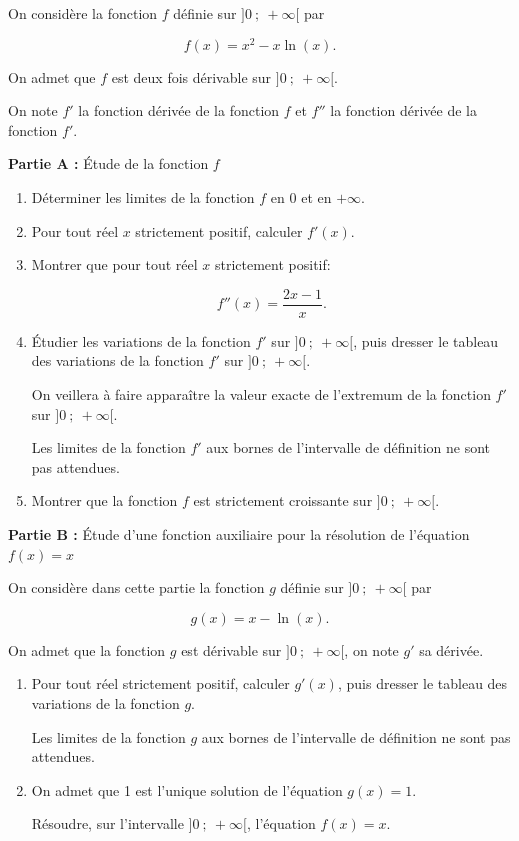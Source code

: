 \medskip

On considère la fonction $f$ définie sur $]0 ~;~+ \infty[$ par 

\[f(x) = x^2 - x \ln (x).\]

On admet que $f$ est deux fois dérivable sur $]0 ~;~+ \infty[$.

On note $f'$ la fonction dérivée de la fonction $f$ et $f''$ la fonction dérivée de la fonction $f'$.

\medskip

\textbf{Partie A :} Étude de la fonction $f$

\medskip

\begin{enumerate}
\item Déterminer les limites de la fonction $f$ en $0$ et en $+\infty$.
\item Pour tout réel $x$ strictement positif, calculer $f'(x)$.
\item Montrer que pour tout réel $x$ strictement positif:

\[f''(x) = \dfrac{2x - 1}{x}.\]

\item Étudier les variations de la fonction $f'$ sur $]0 ~;~+ \infty[$, puis dresser le tableau des variations de la fonction $f'$ sur $]0 ~;~+ \infty[$.

On veillera à faire apparaître la valeur exacte de l'extremum de la fonction $f'$ sur $]0 ~;~+ \infty[$.

Les limites de la fonction $f'$ aux bornes de l'intervalle de définition ne sont pas attendues.
\item Montrer que la fonction $f$ est strictement croissante sur $]0 ~;~+ \infty[$.
\end{enumerate}

\medskip

\textbf{Partie B :} Étude d'une fonction auxiliaire pour la résolution de l'équation $f(x) = x $

\medskip

On considère dans cette partie la fonction $g$ définie sur $]0 ~;~+ \infty[$ par 

\[g(x) = x - \ln (x).\]

On admet que la fonction $g$ est dérivable sur $]0 ~;~+ \infty[$, on note $g'$ sa dérivée.

\medskip

\begin{enumerate}
\item Pour tout réel strictement positif, calculer $g'(x)$, puis dresser le tableau des variations de la fonction $g$.

Les limites de la fonction $g$ aux bornes de l'intervalle de définition ne sont pas attendues.
\item On admet que 1 est l'unique solution de l'équation $g(x) = 1$.

Résoudre, sur l'intervalle $]0 ~;~+ \infty[$, l'équation $f(x) = x$.
\end{enumerate}

